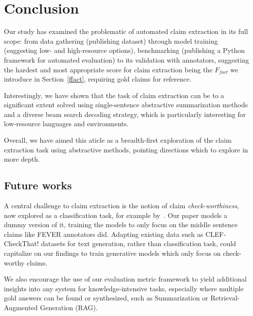 \section{Conclusion}\label{sec:conclusion}
Our study has examined the problematic of automated claim extraction in its full scope: from data gathering (publishing \ds{} dataset) through model training (suggesting low- and high-resource options), benchmarking (publishing a Python framework for automated evaluation) to its validation with annotators, suggesting the hardest and most appropriate score for claim extraction being the $F_{fact}$ we introduce in Section~\ref{ffact}, requiring gold claims for reference.

Interestingly, we have shown that the task of claim extraction can be to a significant extent solved using single-sentence abstractive summarization methods and a diverse beam search decoding strategy, which is particularly interesting for low-resource languages and environments.

Overall, we have aimed this aticle as a breadth-first exploration of the claim extraction task using abstractive methods, pointing directions which to explore in more depth.
\subsection{Future works}
\begin{comment}
\begin{enumerate}
\item 
\end{comment}
    
A central challenge to claim extraction is the notion of claim \textit{check-worthiness}, now explored as a classification task, for example by~\citealt{10.1007/978-3-031-28241-6_59}.
Our paper models a dummy version of it, training the models to only focus on the middle sentence claims like FEVER annotators did.
Adapting existing data such as CLEF-CheckThat! datasets for text generation, rather than classification task, could capitalize on our findings to train generative models which only focus on check-worthy claims.

We also encourage the use of our evaluation metric framework to yield additional insights into any system for knowledge-intensive tasks, especially where multiple gold answers can be found or synthesized, such as Summarization or Retrieval-Augmented Generation (RAG).
\begin{comment}
    \item Propose more datasets
    \item Validate the claim quality metrics using human annotations and tune the choice of models as well as weights of each metric to obtain the best match
\end{enumerate}
\end{comment}

